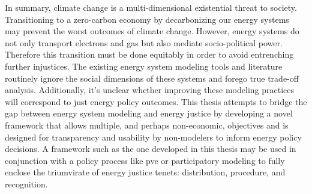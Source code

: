 In summary, climate change is a multi-dimensional existential threat to society.
Transitioning to a zero-carbon economy by decarbonizing our energy systems may
prevent the worst outcomes of climate change. However, energy systems do not
only transport electrons and gas but also mediate socio-political power.
Therefore this transition must be done equitably in order to avoid entrenching
further injustices. The existing energy system modeling tools and literature
routinely ignore the social dimensions of these systems and forego true
trade-off analysis. Additionally, it's unclear whether improving these modeling
practices will correspond to just energy policy outcomes. This thesis attempts
to bridge the gap between energy system modeling and energy justice by
developing a novel framework that allows multiple, and perhaps non-economic,
objectives and is designed for transparency and usability by non-modelers to
inform energy policy decisions. A framework such as the one developed in this
thesis may be used in conjunction with a policy process like \ac{pve} or
participatory modeling to fully enclose the triumvirate of energy justice
tenets: distribution, procedure, and recognition.
